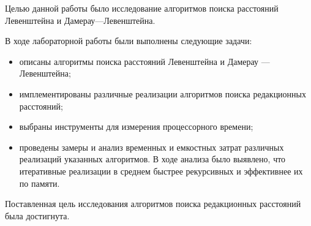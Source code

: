
Целью данной работы было исследование алгоритмов поиска расстояний Левенштейна и Дамерау---Левенштейна.

В ходе лабораторной работы были выполнены следующие задачи:
\begin{itemize}[label=---]
	\item описаны алгоритмы поиска расстояний Левенштейна и Дамерау --- Левенштейна;
	\item имплементированы различные реализации алгоритмов поиска редакционных расстояний;
	\item выбраны инструменты для измерения процессорного времени;
	\item проведены замеры и анализ временных и емкостных затрат различных реализаций указанных алгоритмов. В ходе анализа было выявлено, что итеративные реализации в среднем быстрее рекурсивных и эффективнее их по памяти.
\end{itemize} 

Поставленная цель исследования алгоритмов поиска редакционных расстояний была достигнута.